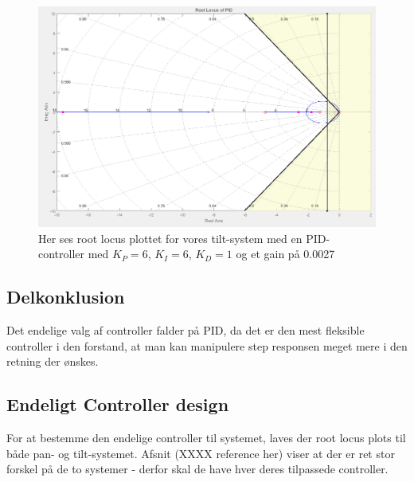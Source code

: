 \begin{figure}[ht]
	\begin{center}
		\includegraphics[scale=0.45]{Billeder/PID_rlocus.PNG}
	\end{center}
\caption{Her ses root locus plottet for vores tilt-system med en PID-controller med $K_{P}=6$, $K_{I}=6$, $K_{D}=1$ og et gain på 0.0027}
\label{fig:PID_rlocus}
\end{figure}

\subsection{Delkonklusion}

Det endelige valg af controller falder på PID, da det er den mest fleksible controller i den forstand, at man kan manipulere step responsen meget mere i den retning der ønskes.


\subsection{Endeligt Controller design}

For at bestemme den endelige controller til systemet, laves der root locus plots til både pan- og tilt-systemet. Afsnit (XXXX reference her) viser at der er ret stor forskel på de to systemer - derfor skal de have hver deres tilpassede controller.

